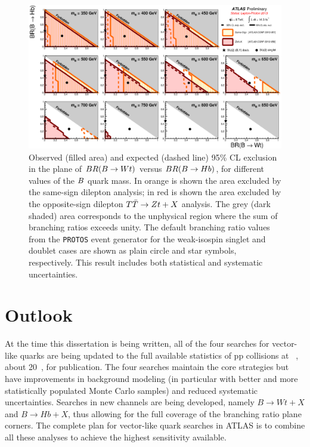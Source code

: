 \begin{landscape}
\begin{figure}[h!bt]
\centering
\includegraphics[width=1.5\textwidth]{results/figures/ATLAS_VLQ_BB_june2013_step2.eps}
\caption{
Observed (filled area) and expected (dashed line) 95\% CL exclusion in the plane of
$BR(\B \to Wt)$ versus $BR(\B \to Hb)$, for different values of the $\B$ quark mass.
In orange is shown the area excluded by the same-sign dilepton analysis;
in red is shown the area excluded by the opposite-sign dilepton $\TTbar\to Zt+X$ analysis.
The grey (dark shaded) area corresponds to the unphysical region where the sum of branching ratios exceeds unity. 
The default branching ratio values from the \texttt{PROTOS} event generator for the weak-isospin singlet and doublet cases 
are shown as plain circle and star symbols, respectively. This result includes both statistical and systematic uncertainties.
\label{fig:limits2D_allvlb}}
\end{figure}
\end{landscape}



\section{Outlook}\label{sec:combOUT}

At the time this dissertation is being
written, all of the four searches for
vector-like quarks are being updated to
the full available statistics of
pp collisions at ~\tev, about 20~\ifb,
for publication. The four searches maintain the
core strategies but have improvements in
background modeling (in particular with better
and more statistically populated Monte Carlo samples)
and reduced systematic uncertainties.
Searches in new channels are being developed, namely
$B\to Wt+X$ and $B\to Hb+X$, thus allowing for
the full coverage of the branching ratio plane corners.
The complete plan for vector-like quark searches
in ATLAS is to combine all these analyses to 
achieve the highest sensitivity available.

